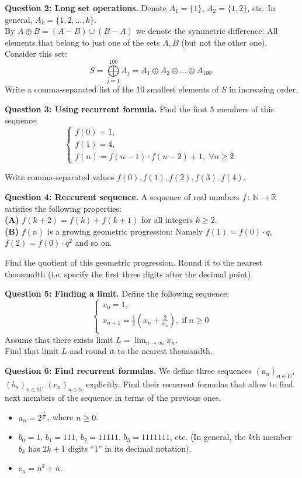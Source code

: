 \documentclass[jou]{apa6}
\begin{document}
\vspace{6pt}
{\bf Question 2: Long set operations.} Denote $A_1 = \{ 1 \}$, $A_2 = \{ 1,2 \}$, etc. 
In general, $A_k = \{ 1,2,\ldots,k\}$.\\ 
By $A \oplus B = (A - B) \cup (B-A)$
we denote the symmetric difference: All elements that belong to just one of the
sets $A,B$ (but not the other one). 
Consider this set:
$$S = \bigoplus\limits_{j=1}^{100} A_j = A_1 \oplus A_2 \oplus \ldots \oplus A_{100}.$$
Write a comma-separated list of the $10$ smallest elements of $S$ in 
increasing order.

\vspace{6pt}
{\bf Question 3: Using recurrent formula.}
Find the first $5$ members of this sequence: 
$$\left\{ \begin{array}{l} 
f(0) = 1,\\
f(1) = 4,\\
f(n) = f(n - 1) \cdot f(n - 2) + 1,\; \forall n \geq 2.
\end{array} \right.$$

Write comma-separated values $f(0),f(1),f(2),f(3),f(4)$.

\vspace{6pt}
{\bf Question 4: Reccurent sequence.} A sequence of real numbers 
$f\,:\,\mathbb{N} \rightarrow \mathbb{R}$ satisfies 
the following properties:\\
{\bf (A)} $f(k+2) = f(k) + f(k+1)$ for all integers $k \geq 2$.\\
{\bf (B)} $f(n)$ is a growing geometric progression: Namely $f(1) = f(0) \cdot q$, 
$f(2) = f(0) \cdot q^2$ and so on.


Find the quotient of this geometric progression. Round it to 
the nearest thousandth (i.e. specify the first three digits after the decimal point). 

\vspace{6pt}
{\bf Question 5: Finding a limit.} Define the following sequence: 
$$\left\{ \begin{array}{l} 
x_0 = 1,\\
x_{n+1} = \frac{1}{2} \left( x_n + \frac{2}{x_n}\right),\;\text{if}\;n\geq 0\\
\end{array} \right.$$
Assume that there exists limit $L = \lim_{n \rightarrow \infty} x_n$.\\
Find that limit $L$ and round it to 
the nearest thousandth. 

\vspace{6pt}
{\bf Question 6: Find recurrent formulas.} 
We define three sequences $(a_n)_{n \in \mathbb{N}}$, 
$(b_n)_{n \in \mathbb{N}}$, $(c_n)_{n \in \mathbb{N}}$ explicitly. 
Find their recurrent formulas that allow to find next members of the 
sequence in terms of the previous ones.
\begin{itemize}
\item ${\displaystyle a_n = 2^{\frac{1}{2^n}}}$, where $n \geq 0$. 
\item $b_0 = 1$, $b_1 = 111$, $b_2 = 11111$, $b_3 = 1111111$, etc. 
(In general, the $k$th member $b_k$ has $2k+1$ digits ``1'' in its decimal notation). 
\item $c_n = n^2 + n$. 
\end{itemize}
\end{document}
